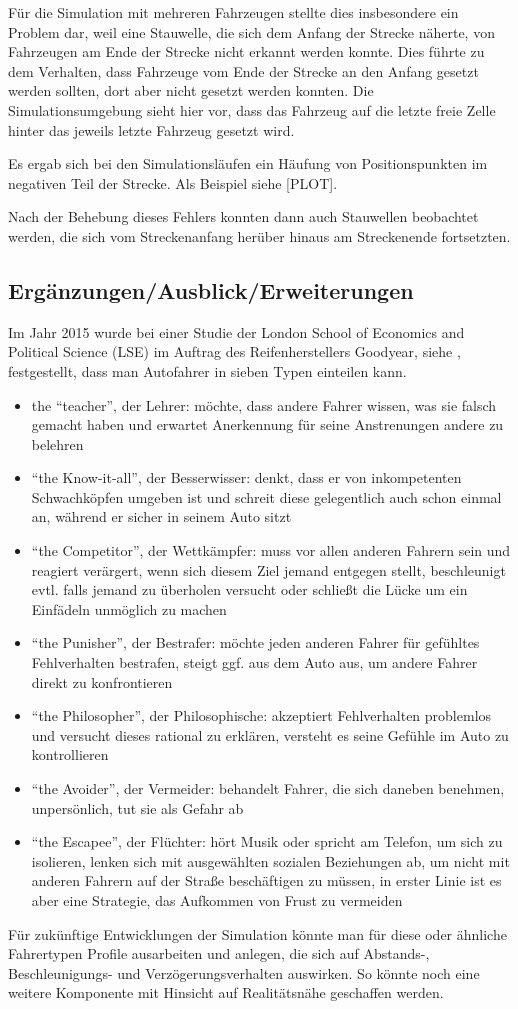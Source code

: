 Für die Simulation mit mehreren Fahrzeugen stellte dies insbesondere ein Problem dar, weil eine Stauwelle, die sich dem Anfang der Strecke näherte, von Fahrzeugen am Ende der Strecke nicht erkannt werden konnte.
Dies führte zu dem Verhalten, dass Fahrzeuge vom Ende der Strecke an den Anfang gesetzt werden sollten, dort aber nicht gesetzt werden konnten.
Die Simulationsumgebung sieht hier vor, dass das Fahrzeug auf die letzte freie Zelle hinter das jeweils letzte Fahrzeug gesetzt wird.

Es ergab sich bei den Simulationsläufen ein Häufung von Positionspunkten im negativen Teil der Strecke. 
Als Beispiel siehe [PLOT].

Nach der Behebung dieses Fehlers konnten dann auch Stauwellen beobachtet werden, die sich vom Streckenanfang herüber hinaus am Streckenende fortsetzten. 



\subsection{Ergänzungen/Ausblick/Erweiterungen}

Im Jahr 2015 wurde bei einer Studie der London School of Economics and Political Science (LSE) im Auftrag des Reifenherstellers Goodyear, siehe \cite{fahrer-typen}, festgestellt, dass man Autofahrer in sieben Typen einteilen kann.

\begin{itemize}
	\item the \enquote{teacher}, der Lehrer: möchte, dass andere Fahrer wissen, was sie falsch gemacht haben und erwartet Anerkennung für seine Anstrenungen andere zu belehren
	\item \enquote{the Know-it-all}, der Besserwisser: denkt, dass er von inkompetenten Schwachköpfen umgeben ist und schreit diese gelegentlich auch schon einmal an, während er sicher in seinem Auto sitzt
	\item \enquote{the Competitor}, der Wettkämpfer: muss vor allen anderen Fahrern sein und reagiert verärgert, wenn sich diesem Ziel jemand entgegen stellt, beschleunigt evtl. falls jemand zu überholen versucht oder schließt die Lücke um ein Einfädeln unmöglich zu machen
	\item \enquote{the Punisher}, der Bestrafer: möchte jeden anderen Fahrer für gefühltes Fehlverhalten bestrafen, steigt ggf. aus dem Auto aus, um andere Fahrer direkt zu konfrontieren
	\item \enquote{the Philosopher}, der Philosophische: akzeptiert Fehlverhalten problemlos und versucht dieses rational zu erklären, versteht es seine Gefühle im Auto zu kontrollieren
	\item \enquote{the Avoider}, der Vermeider: behandelt Fahrer, die sich daneben benehmen, unpersönlich, tut sie als Gefahr ab
	\item \enquote{the Escapee}, der Flüchter: hört Musik oder spricht am Telefon, um sich zu isolieren, lenken sich mit ausgewählten sozialen Beziehungen ab, um nicht mit anderen Fahrern auf der Straße beschäftigen zu müssen, in erster Linie ist es aber eine Strategie, das Aufkommen von Frust zu vermeiden
\end{itemize}

Für zukünftige Entwicklungen der Simulation könnte man für diese oder ähnliche Fahrertypen Profile ausarbeiten und anlegen, die sich auf Abstands-, Beschleunigungs- und Verzögerungsverhalten auswirken.
So könnte noch eine weitere Komponente mit Hinsicht auf Realitätsnähe geschaffen werden. 